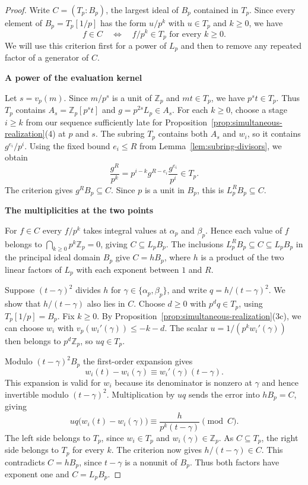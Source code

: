 \documentclass{article}
\newcommand{\proofheading}[1]{%
    \par\addvspace{\smallskipamount}%
    \noindent\textbf{#1}\par\nobreak
}
\theoremstyle{remark}
\begin{document}
\begin{proof}
    Write $C = (T_p : B_p)$, the largest ideal of $B_p$ contained in $T_p$.
    Since every element of $B_p = T_p[1/p]$ has the form $u/p^k$ with $u \in T_p$ and $k \ge 0$, we have
    \[
        f \in C \quad\Longleftrightarrow\quad f/p^k \in T_p
        \text{ for every } k \ge 0.
    \]
    We will use this criterion first for a power of $L_p$ and then to remove any repeated factor of a generator of $C$.

    \proofheading{A power of the evaluation kernel}
    Let $s = v_p(m)$.
    Since $m/p^s$ is a unit of $\mathbb{Z}_p$ and $mt \in T_p$, we have $p^s t \in T_p$.
    Thus $T_p$ contains $A_s = \mathbb{Z}_p[p^s t]$ and $g = p^{2s}L_p \in A_s$.
    For each $k \ge 0$, choose a stage $i \ge k$ from our sequence sufficiently late for Proposition~\ref{prop:simultaneous-realization}(4) at $p$ and $s$.
    The subring $T_p$ contains both $A_s$ and $w_i$, so it contains $g^{e_i}/p^i$.
    Using the fixed bound $e_i \le R$ from Lemma~\ref{lem:subring-divisors}, we obtain
    \[
        \frac{g^R}{p^k}
        = p^{i - k} g^{R - e_i} \frac{g^{e_i}}{p^i} \in T_p.
    \]
    The criterion gives $g^R B_p \subseteq C$.
    Since $p$ is a unit in $B_p$, this is $L_p^R B_p \subseteq C$.

    \proofheading{The multiplicities at the two points}
    For $f \in C$ every $f/p^k$ takes integral values at $\alpha_p$ and $\beta_p$.
    Hence each value of $f$ belongs to $\bigcap_{k \ge 0} p^k \mathbb{Z}_p = 0$, giving $C \subseteq L_p B_p$.
    The inclusions $L_p^R B_p \subseteq C \subseteq L_p B_p$ in the principal ideal domain $B_p$ give $C = h B_p$, where $h$ is a product of the two linear factors of $L_p$ with each exponent between $1$ and $R$.

    Suppose $(t - \gamma)^2$ divides $h$ for $\gamma \in \{\alpha_p, \beta_p\}$, and write $q = h/(t - \gamma)^2$.
    We show that $h/(t - \gamma)$ also lies in $C$.
    Choose $d \ge 0$ with $p^d q \in T_p$, using $T_p[1/p] = B_p$.
    Fix $k \ge 0$.
    By Proposition~\ref{prop:simultaneous-realization}(3c), we can choose $w_i$ with $v_p(w_i'(\gamma)) \le -k - d$.
    The scalar $u = 1/(p^k w_i'(\gamma))$ then belongs to $p^d \mathbb{Z}_p$, so $uq \in T_p$.

    Modulo $(t - \gamma)^2 B_p$ the first-order expansion gives
    \[
        w_i(t) - w_i(\gamma) \equiv w_i'(\gamma)(t - \gamma).
    \]
    This expansion is valid for $w_i$ because its denominator is nonzero at $\gamma$ and hence invertible modulo $(t - \gamma)^2$.
    Multiplication by $uq$ sends the error into $h B_p = C$, giving
    \[
        uq\bigl(w_i(t) - w_i(\gamma)\bigr)
        \equiv \frac{h}{p^k(t - \gamma)} \pmod{C}.
    \]
    The left side belongs to $T_p$, since $w_i \in T_p$ and $w_i(\gamma) \in \mathbb{Z}_p$.
    As $C \subseteq T_p$, the right side belongs to $T_p$ for every $k$.
    The criterion now gives $h/(t - \gamma) \in C$.
    This contradicts $C = h B_p$, since $t - \gamma$ is a nonunit of $B_p$.
    Thus both factors have exponent one and $C = L_p B_p$.
\end{proof}
\end{document}
